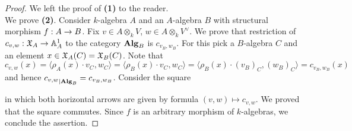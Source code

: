 \begin{proof}
We left the proof of \textbf{(1)} to the reader.\\
We prove \textbf{(2)}. Consider $k$-algebra $A$ and an $A$-algebra $B$ with structural morphism $f:A\rightarrow B$. Fix $v\in A\otimes_kV$, $w\in A\otimes_kV^{\vee}$. We prove that restriction of $c_{v,w}:{\mathfrak X}_A\rightarrow \mathbb{A}^1_A$ to the category $\mathbf{Alg}_B$ is $c_{v_B,w_B}$. For this pick a $B$-algebra $C$ and an element $x\in {\mathfrak X}_A(C)={\mathfrak X}_B(C)$. Note that
$$c_{v,w}(x)= \langle \rho_A(x)\cdot v_C,w_C \rangle =  \langle \rho_B(x)\cdot v_C,w_C\rangle = \langle \rho_B(x)\cdot (v_B)_C,(w_B)_C\rangle = c_{v_B,w_B}(x)$$
and hence ${c_{v,w}}_{\mid \mathbf{Alg}_B}=c_{v_B,w_B}$. Consider the square
\begin{center}
\end{center}
in which both horizontal arrows are given by formula $(v,w)\mapsto c_{v,w}$. We proved that the square commutes. Since $f$ is an arbitrary morphism of $k$-algebras, we conclude the assertion.
\end{proof}

